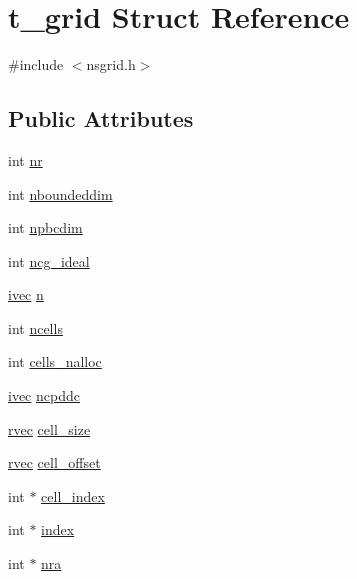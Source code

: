 \hypertarget{structt__grid}{\section{t\-\_\-grid \-Struct \-Reference}
\label{structt__grid}
}


{\ttfamily \#include $<$nsgrid.\-h$>$}

\subsection*{\-Public \-Attributes}
\begin{DoxyCompactItemize}
\item 
int \hyperlink{structt__grid_a383708e4192628ef144b16598866e981}{nr}
\item 
int \hyperlink{structt__grid_a72527fac7169fbb66c9278b616374db8}{nboundeddim}
\item 
int \hyperlink{structt__grid_aad606564746368b18ef3300b07453968}{npbcdim}
\item 
int \hyperlink{structt__grid_a013ed31d767cbb80f7d4222e73c02c4a}{ncg\-\_\-ideal}
\item 
\hyperlink{share_2template_2gromacs_2types_2simple_8h_a74f6ffdb4a9c1764f5293969d8c681b6}{ivec} \hyperlink{structt__grid_a00b59b20fe33cf1a6d75f8034f5e3e26}{n}
\item 
int \hyperlink{structt__grid_a841f705cdcf12712911800e2a1dc994e}{ncells}
\item 
int \hyperlink{structt__grid_a524584efb2dde59cfe21001f2b9ab239}{cells\-\_\-nalloc}
\item 
\hyperlink{share_2template_2gromacs_2types_2simple_8h_a74f6ffdb4a9c1764f5293969d8c681b6}{ivec} \hyperlink{structt__grid_aea691a1400ff37d38b5ce558366b2224}{ncpddc}
\item 
\hyperlink{share_2template_2gromacs_2types_2simple_8h_aa02a552a4abd2f180c282a083dc3a999}{rvec} \hyperlink{structt__grid_a0af230aa84797ac22dac168f73d8d130}{cell\-\_\-size}
\item 
\hyperlink{share_2template_2gromacs_2types_2simple_8h_aa02a552a4abd2f180c282a083dc3a999}{rvec} \hyperlink{structt__grid_a37a27900f58a8dea74146aafdc2fc9fb}{cell\-\_\-offset}
\item 
int $\ast$ \hyperlink{structt__grid_af5430fe5061f78cbd27e027de1d150f3}{cell\-\_\-index}
\item 
int $\ast$ \hyperlink{structt__grid_a8c80d0b6d4693167a70356908bcd72e8}{index}
\item 
int $\ast$ \hyperlink{structt__grid_a18a8c385e0bfabe5c7e0cf7959213ea7}{nra}

\end{DoxyCompactItemize}
